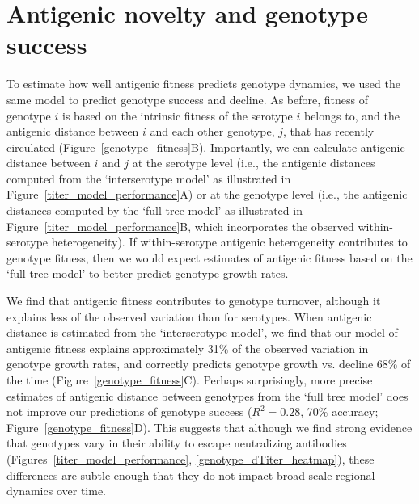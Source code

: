 \section{Antigenic novelty and genotype success}
To estimate how well antigenic fitness predicts genotype dynamics, we used the same model to predict genotype success and decline.
As before, fitness of genotype $i$ is based on the intrinsic fitness of the serotype $i$ belongs to, and the antigenic distance between $i$ and each other genotype, $j$, that has recently circulated (Figure~\ref{genotype_fitness}B).
Importantly, we can calculate antigenic distance between $i$ and $j$ at the serotype level (i.e., the antigenic distances computed from the `interserotype model' as illustrated in Figure~\ref{titer_model_performance}A) or at the genotype level (i.e., the antigenic distances computed by the `full tree model' as illustrated in Figure~\ref{titer_model_performance}B, which incorporates the observed within-serotype heterogeneity).
If within-serotype antigenic heterogeneity contributes to genotype fitness, then we would expect estimates of antigenic fitness based on the `full tree model' to better predict genotype growth rates.

We find that antigenic fitness contributes to genotype turnover, although it explains less of the observed variation than for serotypes.
When antigenic distance is estimated from the `interserotype model', we find that our model of antigenic fitness explains approximately 31\% of the observed variation in genotype growth rates, and correctly predicts genotype growth vs. decline 68\% of the time (Figure~\ref{genotype_fitness}C).
Perhaps surprisingly, more precise estimates of antigenic distance between genotypes from the `full tree model' does not improve our predictions of genotype success ($R^2 = 0.28$, 70\% accuracy; Figure~\ref{genotype_fitness}D).
This suggests that although we find strong evidence that genotypes vary in their ability to escape neutralizing antibodies (Figures~\ref{titer_model_performance}, \ref{genotype_dTiter_heatmap}), these differences are subtle enough that they do not impact broad-scale regional dynamics over time.

